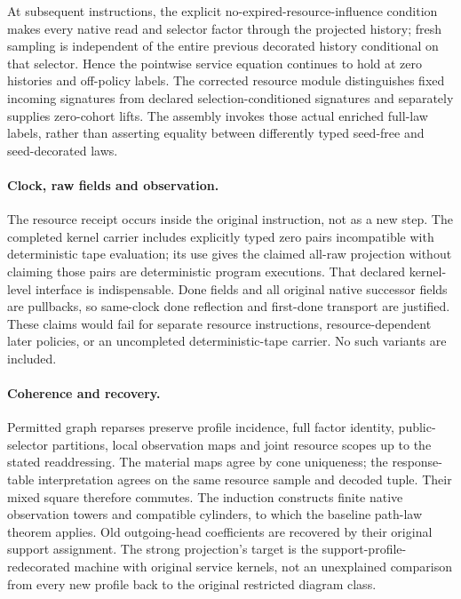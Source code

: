 \documentclass{article}
\begin{document}
At subsequent instructions, the explicit no-expired-resource-influence condition makes every native read and selector factor through the projected history; fresh sampling is independent of the entire previous decorated history conditional on that selector. Hence the pointwise service equation continues to hold at zero histories and off-policy labels. The corrected resource module distinguishes fixed incoming signatures from declared selection-conditioned signatures and separately supplies zero-cohort lifts. The assembly invokes those actual enriched full-law labels, rather than asserting equality between differently typed seed-free and seed-decorated laws.

\paragraph{Clock, raw fields and observation.}
The resource receipt occurs inside the original instruction, not as a new step. The completed kernel carrier includes explicitly typed zero pairs incompatible with deterministic tape evaluation; its use gives the claimed all-raw projection without claiming those pairs are deterministic program executions. That declared kernel-level interface is indispensable. Done fields and all original native successor fields are pullbacks, so same-clock done reflection and first-done transport are justified. These claims would fail for separate resource instructions, resource-dependent later policies, or an uncompleted deterministic-tape carrier. No such variants are included.

\paragraph{Coherence and recovery.}
Permitted graph reparses preserve profile incidence, full factor identity, public-selector partitions, local observation maps and joint resource scopes up to the stated readdressing. The material maps agree by cone uniqueness; the response-table interpretation agrees on the same resource sample and decoded tuple. Their mixed square therefore commutes. The induction constructs finite native observation towers and compatible cylinders, to which the baseline path-law theorem applies. Old outgoing-head coefficients are recovered by their original support assignment. The strong projection's target is the support-profile-redecorated machine with original service kernels, not an unexplained comparison from every new profile back to the original restricted diagram class.
\end{document}
